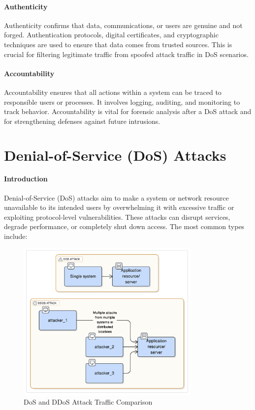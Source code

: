 \documentclass{report}
\begin{document}
\paragraph{Authenticity} 
Authenticity confirms that data, communications, or users are genuine and not forged. Authentication protocols, digital certificates, and cryptographic techniques are used to ensure that data comes from trusted sources. This is crucial for filtering legitimate traffic from spoofed attack traffic in DoS scenarios.

\paragraph{Accountability} 
Accountability ensures that all actions within a system can be traced to responsible users or processes. It involves logging, auditing, and monitoring to track behavior. Accountability is vital for forensic analysis after a DoS attack and for strengthening defenses against future intrusions.

\section{Denial-of-Service (DoS) Attacks}

\paragraph{Introduction} 
Denial-of-Service (DoS) attacks aim to make a system or network resource unavailable to its intended users by overwhelming it with excessive traffic or exploiting protocol-level vulnerabilities. These attacks can disrupt services, degrade performance, or completely shut down access. The most common types include:

\begin{figure}[ht]
    \centering
    \includegraphics[width=0.8\textwidth]{images/dos-ddos-graph.png}
    \caption{DoS and DDoS Attack Traffic Comparison}
    \vspace{-0.5em}
\end{figure}
\end{document}
